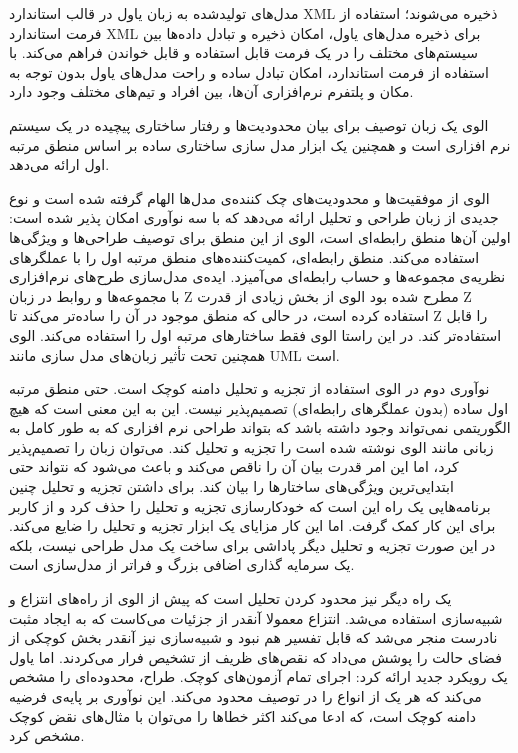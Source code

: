 مدل‌های تولیدشده به زبان یاول در قالب استاندارد XML ذخیره می‌شوند؛ استفاده از فرمت استاندارد XML برای ذخیره مدل‌های یاول، امکان ذخیره و تبادل داده‌ها بین سیستم‌های مختلف را در یک فرمت قابل استفاده و قابل خواندن فراهم می‌کند. با استفاده از فرمت استاندارد، امکان تبادل ساده و راحت مدل‌های یاول بدون توجه به مکان و پلتفرم نرم‌افزاری آن‌ها، بین افراد و تیم‌های مختلف وجود دارد.

الوی یک زبان توصیف برای بیان محدودیت‌ها و رفتار ساختاری پیچیده در یک سیستم نرم افزاری است و همچنین یک ابزار مدل سازی ساختاری ساده بر اساس منطق مرتبه اول ارائه می‌دهد.

الوی از موفقیت‌ها و محدودیت‌های چک کننده‌ی مدل‌ها الهام گرفته شده است و نوع جدیدی از زبان طراحی و تحلیل ارائه می‌دهد که با سه نوآوری امکان پذیر شده‌ است:
 اولین آن‌ها منطق رابطه‌ای است، الوی از این منطق برای توصیف طراحی‌ها و ویژگی‌ها استفاده می‌کند. منطق رابطه‌ای، کمیت‌کننده‌های منطق مرتبه اول را با عملگرهای نظریه‌ی مجموعه‌ها و حساب رابطه‌ای می‌آمیزد. ایده‌ی مدل‌سازی طرح‌های نرم‌افزاری با مجموعه‌ها و روابط در زبان Z مطرح شده بود الوی از بخش زیادی از قدرت Z استفاده کرده است، در حالی که منطق موجود در آن را ساده‌تر می‌کند تا Z را قابل استفاده‌تر کند. در این راستا الوی فقط ساختارهای مرتبه اول را استفاده می‌کند. الوی همچنین تحت تأثیر زبان‌های مدل سازی مانند UML است.

 نوآوری دوم در الوی استفاده از تجزیه و تحلیل دامنه کوچک است. حتی منطق مرتبه اول ساده (بدون عملگرهای رابطه‌ای) تصمیم‌پذیر نیست. این به این معنی است که هیچ الگوریتمی نمی‌تواند وجود داشته باشد که بتواند طراحی نرم افزاری که به طور کامل به زبانی مانند الوی نوشته شده است را تجزیه و تحلیل کند. می‌توان زبان را تصمیم‌پذیر کرد، اما این امر قدرت بیان آن را ناقص می‌کند و باعث می‌شود که نتواند حتی ابتدایی‌ترین ویژگی‌های ساختارها را بیان کند. برای داشتن تجزیه و تحلیل چنین برنامه‌هایی یک راه این است که خودکارسازی تجزیه و تحلیل را حذف کرد و از کاربر برای این کار کمک گرفت. اما این کار مزایای یک ابزار تجزیه و تحلیل را ضایع می‌کند. در این صورت تجزیه و تحلیل دیگر پاداشی برای ساخت یک مدل طراحی نیست، بلکه یک سرمایه گذاری اضافی بزرگ و فراتر از مدل‌سازی است.

یک راه دیگر نیز محدود کردن تحلیل است که پیش از الوی از راه‌های انتزاع و شبیه‌سازی استفاده می‌شد. انتزاع معمولا آنقدر از جزئیات می‌کاست که به ایجاد مثبت نادرست منجر می‌شد که قابل تفسیر هم نبود و شبیه‌سازی نیز آنقدر بخش کوچکی از فضای حالت را پوشش می‌داد که نقص‌های ظریف از تشخیص فرار می‌کردند. اما یاول یک رویکرد جدید ارائه کرد: اجرای تمام آزمون‌های کوچک. طراح، محدوده‌ای را مشخص می‌کند که هر یک از انواع را در توصیف محدود می‌کند. این نوآوری بر پایه‌ی فرضیه دامنه کوچک است، که ادعا می‌کند اکثر خطاها را می‌توان با مثال‌های نقض کوچک مشخص کرد.

